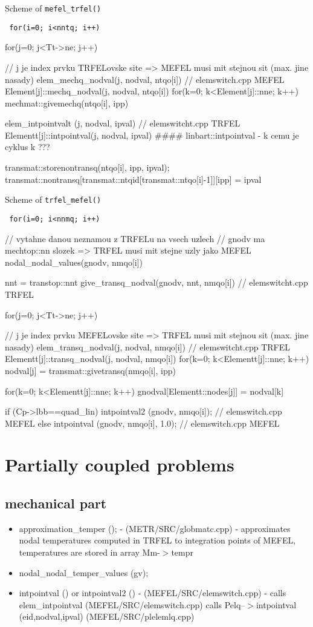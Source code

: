 Scheme of {\tt mefel\_trfel()}
{\tt
for(i=0; i<nntq; i++)
{
  for(j=0; j<Tt->ne; j++)
  {
    // j je index prvku TRFELovske site => MEFEL musi mit stejnou sit (max. jine nasady)
    elem_mechq_nodval(j, nodval, ntqo[i]) // elemswitch.cpp  MEFEL
      Element[j]::mechq_nodval(j, nodval, ntqo[i])
        for(k=0; k<Element[j]::nne; k++)
          mechmat::givemechq(ntqo[i], ipp)
 
    elem_intpointvalt (j, nodval, ipval) // elemswitcht.cpp TRFEL
      Elementt[j]::intpointval(j, nodval, ipval)
        #### linbart::intpointval - k cemu je cyklus k ???

    transmat::storenontransq(ntqo[i], ipp, ipval);
      transmat::nontransq[transmat::ntqid[transmat::ntqo[i]-1]][ipp] = ipval
  }
}
}

Scheme of {\tt trfel\_mefel()}
{\tt
for(i=0; i<nnmq; i++)
{
  // vytahne danou neznamou z TRFELu na vsech uzlech
  // gnodv ma mechtop::nn slozek => TRFEL musi mit stejne uzly jako MEFEL
  nodal_nodal_values(gnodv, nmqo[i])
  {
    nnt = transtop::nnt
    give_transq_nodval(gnodv, nnt, nmqo[i]) // elemswitcht.cpp TRFEL
    {
      for(j=0; j<Tt->ne; j++)
      {
        // j je index prvku MEFELovske site => TRFEL musi mit stejnou sit (max. jine nasady)
        elem_transq_nodval(j, nodval, nmqo[i]) // elemswitcht.cpp TRFEL
          Elementt[j]::transq_nodval(j, nodval, nmqo[i])
            for(k=0; k<Elementt[j]::nne; k++)
              nodval[j] = transmat::givetransq(nmqo[i], ipp)
            
        for(k=0; k<Elementt[j]::nne; k++)
          gnodval[Elementt::nodes[j]] = nodval[k]
      }
    }
  }

  if (Cp->lbb==quad_lin)
    intpointval2 (gnodv, nmqo[i]); // elemswitch.cpp MEFEL
  else
    intpointval (gnodv, nmqo[i], 1.0); // elemswitch.cpp MEFEL

}
}




\section{Partially coupled problems}

\subsection{mechanical part}

\begin{itemize}
\item
approximation\_temper (); - (METR/SRC/globmatc.cpp) - approximates nodal temperatures computed in TRFEL
to integration points of MEFEL, temperatures are stored in array Mm-$>$tempr
\item
nodal_nodal_temper_values (gv);
\item
intpointval () or intpointval2 () - (MEFEL/SRC/elemswitch.cpp) - calls 
elem\_intpointval (MEFEL/SRC/elemswitch.cpp) calls Pelq--$>$intpointval (eid,nodval,ipval) (MEFEL/SRC/plelemlq.cpp)
\end{itemize}

